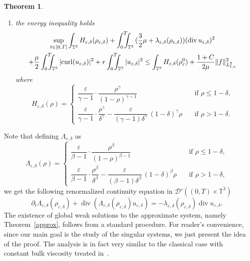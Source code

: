 \documentclass[JEP,XML,SOM,Unicode,NoEqCountersInSection]{cedram}
\let\mathcal\mathscr
\newcommand{\<}{\bigl\langle}
\renewcommand{\>}{\bigr\rangle}
\newcommand{\intTTT}{\int_0^T\hspace*{-2.5mm}\int_{\TT}}
\newcommand{\labeleq}[1]{}
\newtheorem{thm}{Theorem}[section]
\theoremstyle{definition}
\theoremstyle{remark}
\newcommand{\TT}{\mathbb{T}^3}
\DeclareMathOperator{\curl}{curl}
\DeclareMathOperator{\Div}{div}
\let\ep\varepsilon
\begin{document}
\begin{thm}
\begin{enumerate}
\item the energy inequality holds
\begin{multline}\label{eq:energy_delta}
\sup_{t\in[0,T]} \int_{\TT} H_{\ep,\delta}(\rho_{\ep,\delta})
+ \intTTT{(\frac{3}{2}\mu+\lambda_{\ep,\delta}(\rho_{\ep,\delta}))(\Div u_{\ep,\delta})^2 }\\
+ \frac{\mu}{2} \intTTT{ |{\curl (u_{\ep,\delta})}|^2}
+ r \intTTT{ |u_{\ep,\delta}|^2}
\leq \int_{\TT}{H_{\ep,\delta}(\rho_\ep^0)} + \frac{1+C}{2\mu} \|f\|^2_{L^2_{t,x}}
\end{multline}
where
\begin{equation}\label{eq:H_delta}
H_{\ep,\delta}(\rho) =
\begin{cases}
\dfrac{\ep}{\gamma-1}\cdot \dfrac{\rho^{\gamma}}{(1-\rho)^{\gamma-1}} \quad & \text{if } \rho \leq 1-\delta, \\
\dfrac{\ep}{\gamma-1}\cdot \dfrac{\rho^\gamma}{\delta^\gamma} - \dfrac{\ep}{(\gamma - 1) \delta^{\gamma }}\,(1-\delta)^{\gamma} \rho \quad & \text{if } \rho > 1-\delta.
\end{cases}
\end{equation} 
\end{enumerate}
\end{thm}
Note that defining $\Lambda_{\ep,\delta}$ as
\begin{equation*}\labeleq{df:Lambda_delta}
\Lambda_{\ep,\delta}(\rho) =
\begin{cases}
\dfrac{\ep}{\beta-1}\cdot \dfrac{\rho^\beta}{(1-\rho)^{\beta-1}} \quad & \text{if } \rho \leq 1-\delta, \\
\dfrac{\ep}{\beta-1}\cdot \dfrac{\rho^\beta}{\delta^\beta} - \dfrac{\ep}{(\beta-1)\delta^{\beta}}\, (1-\delta)^\beta \rho \quad & \text{if } \rho > 1-\delta,
\end{cases}
\end{equation*}
we get the following renormalized continuity equation in $\mathcal{D}'((0,T)\times \TT)$
\begin{equation}\label{eq:Lambda_delta}
\partial_t \Lambda_{\ep,\delta}(\rho_{\ep,\delta}) + \Div (\Lambda_{\ep,\delta}(\rho_{\ep,\delta}) u_{\ep,\delta}) = - \lambda_{\ep,\delta}(\rho_{\ep,\delta})\Div u_{\ep,\delta}.
\end{equation}
The existence of global weak solutions to the approximate system, namely Theorem~\ref{approx}, follows from a standard procedure.
For reader's convenience, since our main goal is the study of the singular systems, we just present the idea of the proof.
The analysis is in fact very similar to the classical case with constant bulk viscosity treated in~\cite[Chap.\,8.2]{lions1998}.
\end{document}
